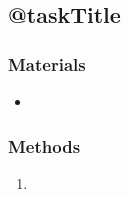 \subsection{@taskTitle}
\label{task:@label}

\subsubsection{Materials}

\begin{itemize}
\item 
\end{itemize}

\subsubsection{Methods}

\begin{enumerate}
\item 
\end{enumerate}


